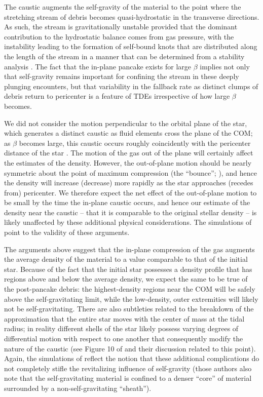 \documentclass[twocolumn]{aastex62}
\begin{document}
The caustic augments the self-gravity of the material to the point where the stretching stream of debris becomes quasi-hydrostatic in the transverse directions. As such, the stream is gravitationally unstable provided that the dominant contribution to the hydrostatic balance comes from gas pressure, with the instability leading to the formation of self-bound knots that are distributed along the length of the stream in a manner that can be determined from a stability analysis \citep{coughlin15, coughlin20a}. The fact that the in-plane pancake exists for large $\beta$ implies not only that self-gravity remains important for confining the stream in these deeply plunging encounters, but that variability in the fallback rate as distinct clumps of debris return to pericenter is a feature of TDEs irrespective of how large $\beta$ becomes. 

We did not consider the motion perpendicular to the orbital plane of the star, which generates a distinct caustic as fluid elements cross the plane of the COM; as $\beta$ becomes large, this caustic occurs roughly coincidently with the pericenter distance of the star \citep{carter83, stone13}. The motion of the gas out of the plane will certainly affect the estimates of the density. However, the out-of-plane motion should be nearly symmetric about the point of maximum compression (the ``bounce''; \citealt{carter83, stone13}), and hence the density will increase (decrease) more rapidly as the star approaches (recedes from) pericenter. We therefore expect the net effect of the out-of-plane motion to be small by the time the in-plane caustic occurs, and hence our estimate of the density near the caustic -- that it is comparable to the original stellar density -- is likely unaffected by these additional physical considerations. The simulations of \citet{steinberg19} point to the validity of these arguments.

The arguments above suggest that the in-plane compression of the gas augments the average density of the material to a value comparable to that of the initial star. Because of the fact that the initial star possesses a density profile that has regions above and below the average density, we expect the same to be true of the post-pancake debris: the highest-density regions near the COM will be safely above the self-gravitating limit, while the low-density, outer extremities will likely not be self-gravitating. There are also subtleties related to the breakdown of the approximation that the entire star moves with the center of mass at the tidal radius; in reality different shells of the star likely possess varying degrees of differential motion with respect to one another that consequently modify the nature of the caustic (see Figure 10 of \citet{coughlin16} and their discussion related to this point). Again, the simulations of \citet{steinberg19} reflect the notion that these additional complications do not completely stifle the revitalizing influence of self-gravity (those authors also note that the self-gravitating material is confined to a denser ``core'' of material surrounded by a non-self-gravitating ``sheath''). 
\end{document}
